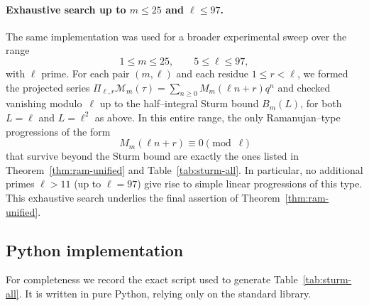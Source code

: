 \documentclass[11pt]{article}
\theoremstyle{definition}
\theoremstyle{remark}
\begin{document}
\paragraph{Exhaustive search up to $m\le25$ and $\ell\le97$.}
The same implementation was used for a broader experimental sweep over the
range
\[
1\le m\le25,\qquad 5\le \ell\le97,
\]
with $\ell$ prime.  For each pair $(m,\ell)$ and each residue $1\le r<\ell$,
we formed the projected series
\(
\Pi_{\ell,r}\mathcal{M}_m(\tau)
=\sum_{n\ge0} M_m(\ell n+r)q^n
\)
and checked vanishing modulo~$\ell$ up to the half--integral Sturm bound
$B_m(L)$, for both $L=\ell$ and $L=\ell^2$ as above.  In this entire range,
the only Ramanujan--type progressions of the form
\[
M_m(\ell n+r)\equiv0\pmod{\ell}
\]
that survive beyond the Sturm bound are exactly the ones listed in
Theorem~\ref{thm:ram-unified} and Table~\ref{tab:sturm-all}.  In particular,
no additional primes $\ell>11$ (up to $\ell=97$) give rise to simple
linear progressions of this type.  This exhaustive search underlies the
final assertion of Theorem~\ref{thm:ram-unified}.



\subsection{Python implementation}

For completeness we record the exact script used to generate
Table~\ref{tab:sturm-all}.  It is written in pure Python, relying only
on the standard library.
\end{document}

